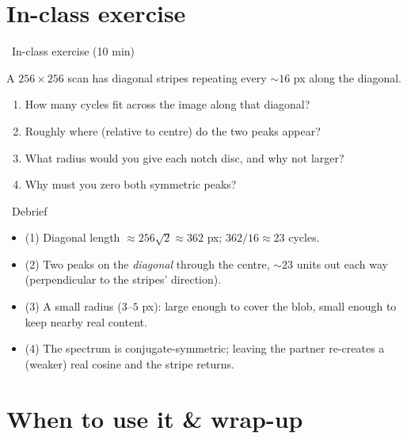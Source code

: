 \documentclass[10pt,aspectratio=169]{beamer}
\begin{document}
\section{In-class exercise}

\begin{frame}{\faPen~In-class exercise (10 min)}
  \begin{infobox}
  \end{infobox}
  A $256\times256$ scan has diagonal stripes repeating every $\sim 16$ px along the diagonal.
  \begin{enumerate}
    \item How many cycles fit across the image along that diagonal?
    \item Roughly where (relative to centre) do the two peaks appear?
    \item What radius would you give each notch disc, and why not larger?
    \item Why must you zero both symmetric peaks?
  \end{enumerate}
\end{frame}

\begin{frame}{\faPen~Debrief}
  \begin{itemize}
    \item (1) Diagonal length $\approx 256\sqrt2\approx362$ px; $362/16\approx 23$ cycles.
    \item (2) Two peaks on the \emph{diagonal} through the centre, $\sim 23$ units out each way
          (perpendicular to the stripes' direction).
    \item (3) A small radius ($3$--$5$ px): large enough to cover the blob, small enough to keep
          nearby real content.
    \item (4) The spectrum is conjugate-symmetric; leaving the partner re-creates a (weaker) real
          cosine and the stripe returns.
  \end{itemize}
\end{frame}

\section{When to use it \& wrap-up}
\end{document}
